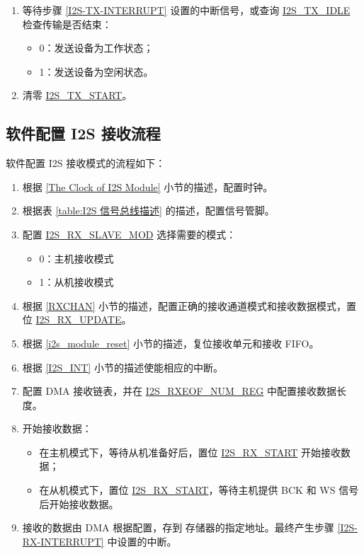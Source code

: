 \documentclass[main\_\_CN.tex]{subfiles}
\begin{document}
\begin{enumerate}
    \item 等待步骤 \ref{I2S-TX-INTERRUPT} 设置的中断信号，或查询 \hyperref[fielddesc:I2STXIDLE]{I2S\_TX\_IDLE} 检查传输是否结束：
    \begin{itemize}
        \item 0：发送设备为工作状态；
        \item 1：发送设备为空闲状态。
    \end{itemize}

    \item 清零 \hyperref[fielddesc:I2STXSTART]{I2S\_TX\_START}。
\end{enumerate}
\subsection{软件配置 I2S 接收流程}\label{sec:configure-i2s-as-rx-mode}
软件配置 I2S 接收模式的流程如下：

\begin{enumerate}
    \item 根据 \ref{The Clock of I2S Module} 小节的描述，配置时钟。

    \item 根据表 \ref{table:I2S 信号总线描述} 的描述，配置信号管脚。

    \item 配置 \hyperref[fielddesc:I2SRXSLAVEMOD]{I2S\_RX\_SLAVE\_MOD} 选择需要的模式：
    \begin{itemize}
        \item 0：主机接收模式
        \item 1：从机接收模式
    \end{itemize}

    \item 根据 \ref{RXCHAN} 小节的描述，配置正确的接收通道模式和接收数据模式，置位 \hyperref[fielddesc:I2SRXUPDATE]{I2S\_RX\_UPDATE}。

    \item 根据 \ref{i2s_module_reset} 小节的描述，复位接收单元和接收 FIFO。
    \item 根据 \ref{I2S_INT} 小节的描述使能相应的中断。\label{I2S-RX-INTERRUPT}

    \item 配置 DMA 接收链表，并在 \hyperref[regdesc:I2SRXEOFNUMREG]{I2S\_RXEOF\_NUM\_REG} 中配置接收数据长度。

    \item 开始接收数据：
    \begin{itemize}
        \item 在主机模式下，等待从机准备好后，置位 \hyperref[fielddesc:I2SRXSTART]{I2S\_RX\_START} 开始接收数据；
        \item 在从机模式下，置位 \hyperref[fielddesc:I2SRXSTART]{I2S\_RX\_START}，等待主机提供 BCK 和 WS 信号后开始接收数据。
    \end{itemize}
    \item 接收的数据由 DMA 根据配置，存到 \chipname{} 存储器的指定地址。最终产生步骤 \ref{I2S-RX-INTERRUPT} 中设置的中断。
\end{enumerate}
\end{document}
